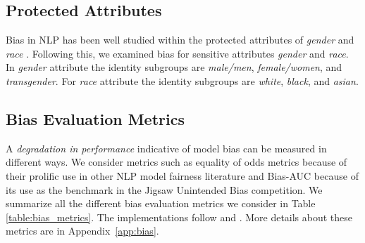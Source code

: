 \documentclass[11pt]{article} %
\begin{document}
\subsection{Protected Attributes} 
Bias in NLP has been well studied within the protected attributes of \textit{gender} \citep{ zhao-etal-2019-gender} and \textit{race} \citep{davidson-etal-2019-racial}. Following this, we examined bias for sensitive attributes \textit{gender} and \textit{race}. In \textit{gender} attribute the identity subgroups are \textit{male/men}, \textit{female/women}, and \textit{transgender}. For \textit{race} attribute the identity subgroups are \textit{white}, \textit{black}, and \textit{asian}.

\subsection{Bias Evaluation Metrics}

A \textit{degradation in performance} indicative of model bias can be measured in different ways. We consider metrics such as equality of odds metrics because of their prolific use in other NLP model fairness literature \citep{hardt2016equality, borkan2019nuanced, reddy2021benchmarking} and Bias-AUC because of its use as the benchmark in the Jigsaw Unintended Bias competition. 
We summarize all the different bias evaluation metrics we consider in Table \ref{table:bias_metrics}. The implementations follow \cite{hardt2016equality, borkan2019nuanced} and \cite{reddy2021benchmarking}.  More details about these metrics are in Appendix~\ref{app:bias}.
\end{document}

